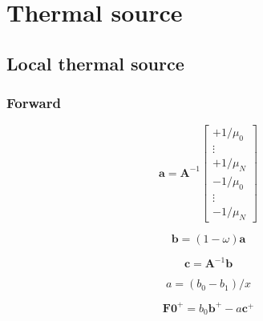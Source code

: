 %
\section{Thermal source}
\label{sec:thermal_source}


\subsection{Local thermal source}
\label{sec:thermal_source_local_thermal_source}


\subsubsection{Forward}
\label{sec:thermal_source_local_thermal_source-forward}

\begin{equation}
\mathbf{a} = \mathbf{A}^{-1}
\left[
\begin{array}{c}
+1 / \mu_{0} \\
\vdots \\
+1 / \mu_{N} \\
-1 / \mu_{0} \\
\vdots \\
-1 / \mu_{N}
\end{array}
\right]
\label{eq:thermal_source_local_thermal_source-forward-a}
\end{equation}

\begin{equation}
\mathbf{b} = (1 - \omega)\mathbf{a}
\label{eq:thermal_source_local_thermal_source-forward-b}
\end{equation}

\begin{equation}
\mathbf{c} = \mathbf{A}^{-1}\mathbf{b}
\label{eq:thermal_source_local_thermal_source-forward-c}
\end{equation}

\begin{equation}
a = (b_{0} - b_{1}) / x
\label{eq:thermal_source_local_thermal_source-forward-a}
\end{equation}

\begin{equation}
\mathbf{F0}^{+} = b_{0} \mathbf{b}^{+} - a \mathbf{c}^{+}
\label{eq:thermal_source_local_thermal_source-forward-f0_p}
\end{equation}


